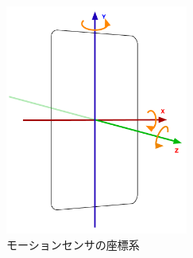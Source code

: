\begin{figure}[hbtp]
  \centering
  \includegraphics[bb=0 0 372 469, width=6cm]{Figures/sensor.pdf}
  \caption{モーションセンサの座標系}
  \label{sensor}
\end{figure}
